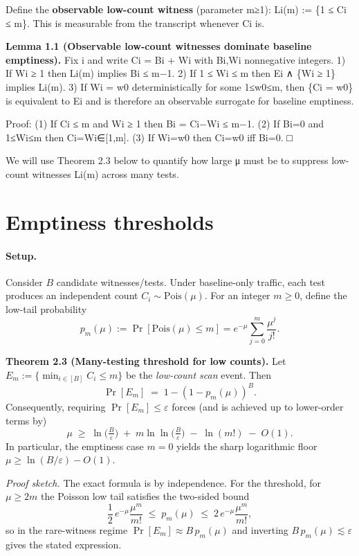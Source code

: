 \documentclass[
 11pt,
]{article}
\begin{document}
Define the \textbf{observable low-count witness} (parameter m≥1): Li(m)
:= \{1 ≤ Ci ≤ m\}. This is measurable from the transcript whenever Ci
is.

\textbf{Lemma 1.1 (Observable low-count witnesses dominate baseline
emptiness).} Fix i and write Ci = Bi + Wi with Bi,Wi nonnegative
integers. 1) If Wi ≥ 1 then Li(m) implies Bi ≤ m−1. 2) If 1 ≤ Wi ≤ m
then Ei ∧ \{Wi ≥ 1\} implies Li(m). 3) If Wi = w0 deterministically for
some 1≤w0≤m, then \{Ci = w0\} is equivalent to Ei and is therefore an
observable surrogate for baseline emptiness.

Proof: (1) If Ci ≤ m and Wi ≥ 1 then Bi = Ci−Wi ≤ m−1. (2) If Bi=0 and
1≤Wi≤m then Ci=Wi∈{[}1,m{]}. (3) If Wi=w0 then Ci=w0 iff Bi=0. □

We will use Theorem 2.3 below to quantify how large μ must be to
suppress low-count witnesses Li(m) across many tests.

\section{Emptiness thresholds}\label{emptiness-thresholds}

\paragraph{Setup.}
Consider \(B\) candidate witnesses/tests. Under baseline-only traffic, each
test produces an independent count \(C_i \sim \mathrm{Pois}(\mu)\).
For an integer \(m\ge 0\), define the low-tail probability
\[
p_m(\mu) := \Pr[\mathrm{Pois}(\mu)\le m]
= e^{-\mu}\sum_{j=0}^m \frac{\mu^j}{j!}.
\]

\textbf{Theorem 2.3 (Many-testing threshold for low counts).}
Let \(E_m := \{\min_{i\in[B]} C_i \le m\}\) be the \emph{low-count scan}
event. Then
\[
\Pr[E_m] \;=\; 1-(1-p_m(\mu))^B.
\]
Consequently, requiring \(\Pr[E_m]\le \varepsilon\) forces (and is achieved
up to lower-order terms by)
\[
\mu \;\ge\; \ln\!\Big(\tfrac{B}{\varepsilon}\Big)
\;+\; m\ln\ln\!\Big(\tfrac{B}{\varepsilon}\Big)
\;-\; \ln(m!) \;-\; O(1).
\]
In particular, the emptiness case \(m=0\) yields the sharp logarithmic floor
\(\mu \ge \ln(B/\varepsilon)-O(1)\).

\emph{Proof sketch.}
The exact formula is by independence.
For the threshold, for \(\mu\ge 2m\) the Poisson low tail satisfies the
two-sided bound
\[
\frac{1}{2}\,e^{-\mu}\frac{\mu^m}{m!}
\;\le\; p_m(\mu) \;\le\;
2\,e^{-\mu}\frac{\mu^m}{m!},
\]
so in the rare-witness regime \(\Pr[E_m]\approx B\,p_m(\mu)\) and inverting
\(B\,p_m(\mu)\lesssim \varepsilon\) gives the stated expression.
\end{document}
